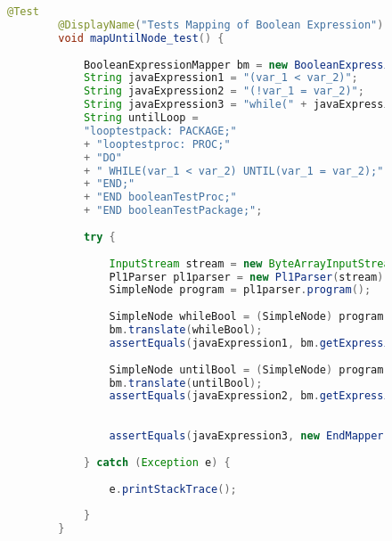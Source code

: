 \begin{figure}[H]
	\begin{lstlisting}[language=Java, caption=mapUntilNode Test, label={lst:untilwhile_test}]
		@Test
		@DisplayName("Tests Mapping of Boolean Expression")
		void mapUntilNode_test() {
			
			BooleanExpressionMapper bm = new BooleanExpressionMapper();
			String javaExpression1 = "(var_1 < var_2)";
			String javaExpression2 = "(!var_1 = var_2)";
			String javaExpression3 = "while(" + javaExpression2 + ")";
			String untilLoop = 
			"looptestpack: PACKAGE;"
			+ "looptestproc: PROC;"
			+ "DO"
			+ "	WHILE(var_1 < var_2) UNTIL(var_1 = var_2);"
			+ "END;"
			+ "END booleanTestProc;"
			+ "END booleanTestPackage;";
			
			try {
				
				InputStream stream = new ByteArrayInputStream(untilLoop.getBytes(StandardCharsets.UTF_8));
				Pl1Parser pl1parser = new Pl1Parser(stream);
				SimpleNode program = pl1parser.program();
				
				SimpleNode whileBool = (SimpleNode) program.jjtGetChild(0).jjtGetChild(0).jjtGetChild(0).jjtGetChild(0);
				bm.translate(whileBool);
				assertEquals(javaExpression1, bm.getExpression());
				
				SimpleNode untilBool = (SimpleNode) program.jjtGetChild(0).jjtGetChild(0).jjtGetChild(0).jjtGetChild(1).jjtGetChild(0);
				bm.translate(untilBool);
				assertEquals(javaExpression2, bm.getExpression());
				
				
				assertEquals(javaExpression3, new EndMapper().getClosingExpression());
				
			} catch (Exception e) {
				
				e.printStackTrace();
				
			}
		}
	\end{lstlisting}
\end{figure}

